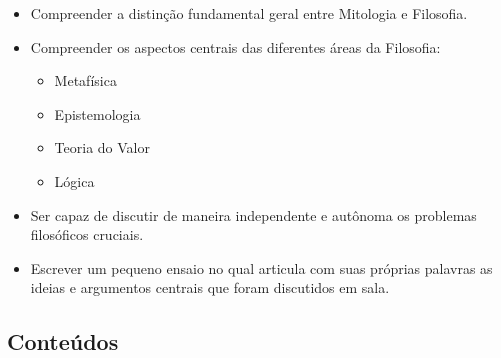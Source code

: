 \documentclass[
	article,			%
	12pt,				%
	twoside,			%
	a4paper,			%
	english,			%
	brazil,				%
	sumario=tradicional
]{plano}
\begin{document}
\begin{itemize}

	\item Compreender a distinção fundamental geral entre Mitologia e Filosofia.
	\item Compreender os aspectos centrais das diferentes áreas da Filosofia:
	\begin{itemize}
		\item Metafísica
		
		\newpage

		\item Epistemologia
		\item Teoria do Valor
		\item Lógica
	\end{itemize}



	\item Ser capaz de discutir de maneira independente e autônoma os problemas filosóficos cruciais.

	\item  Escrever um  pequeno ensaio no qual articula com suas próprias palavras as ideias e argumentos centrais que foram discutidos em sala.

\end{itemize}



\begin{snugshade}
	\section{Conteúdos} %
\end{snugshade}
\end{document}
